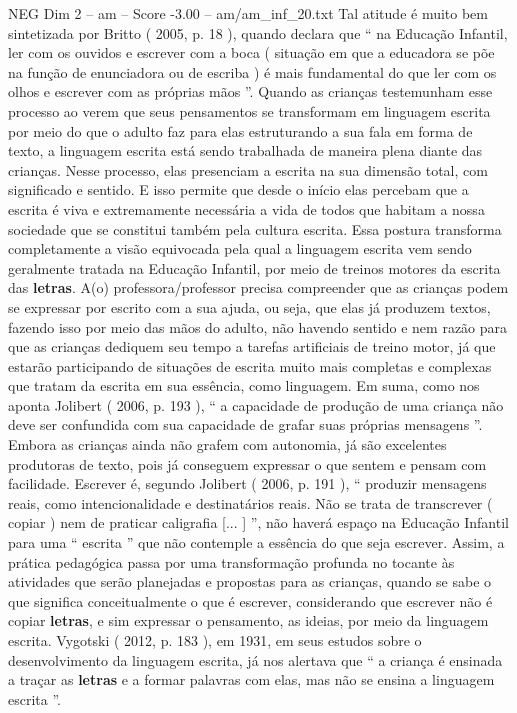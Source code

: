 \begin{textsample}{NEG Dim 2 – am – Score -3.00 – am/am\_inf\_20.txt}
Tal atitude é muito bem sintetizada por Britto ( 2005, p. 18 ), quando declara que “ na Educação Infantil, ler com os ouvidos e escrever com a boca ( situação em que a educadora se põe na função de enunciadora ou de escriba ) é mais fundamental do que ler com os olhos e escrever com as próprias mãos ”.
Quando as crianças testemunham esse processo ao verem que seus pensamentos se transformam em linguagem escrita por meio do que o adulto faz para elas estruturando a sua fala em forma de texto, a linguagem escrita está sendo trabalhada de maneira plena diante das crianças.
Nesse processo, elas presenciam a escrita na sua dimensão total, com significado e sentido.
E isso permite que desde o início elas percebam que a escrita é viva e extremamente necessária a vida de todos que habitam a nossa sociedade que se constitui também pela cultura escrita.
Essa postura transforma completamente a visão equivocada pela qual a linguagem escrita vem sendo geralmente tratada na Educação Infantil, por meio de treinos motores da escrita das \textbf{letras}.
A(o) professora/professor precisa compreender que as crianças podem se expressar por escrito com a sua ajuda, ou seja, que elas já produzem textos, fazendo isso por meio das mãos do adulto, não havendo sentido e nem razão para que as crianças dediquem seu tempo a tarefas artificiais de treino motor, já que estarão participando de situações de escrita muito mais completas e complexas que tratam da escrita em sua essência, como linguagem.
Em suma, como nos aponta Jolibert ( 2006, p. 193 ), “ a capacidade de produção de uma criança não deve ser confundida com sua capacidade de grafar suas próprias mensagens ”.
Embora as crianças ainda não grafem com autonomia, já são excelentes produtoras de texto, pois já conseguem expressar o que sentem e pensam com facilidade.
Escrever é, segundo Jolibert ( 2006, p. 191 ), “ produzir mensagens reais, como intencionalidade e destinatários reais.
Não se trata de transcrever ( copiar ) nem de praticar caligrafia [... ] ”, não haverá espaço na Educação Infantil para uma “ escrita ” que não contemple a essência do que seja escrever.
Assim, a prática pedagógica passa por uma transformação profunda no tocante às atividades que serão planejadas e propostas para as crianças, quando se sabe o que significa conceitualmente o que é escrever, considerando que escrever não é copiar \textbf{letras}, e sim expressar o pensamento, as ideias, por meio da linguagem escrita.
Vygotski ( 2012, p. 183 ), em 1931, em seus estudos sobre o desenvolvimento da linguagem escrita, já nos alertava que “ a criança é ensinada a traçar as \textbf{letras} e a formar palavras com elas, mas não se ensina a linguagem escrita ”.

\end{textsample}
